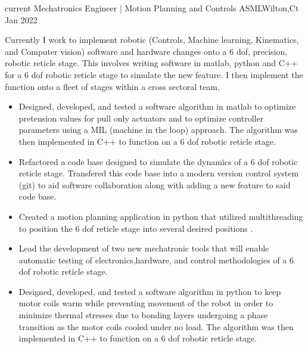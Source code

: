 \begin{experiences}

\experience
  {current}      {Mechatronics Engineer |  Motion Planning and Controls }{ASML}{Wilton,Ct}
  {Jan 2022} {
                  Currently I work to implement robotic (Controls, Machine learning, Kinematics, and Computer vision) software and hardware changes onto a 6 dof, precision, robotic reticle stage. This involves writing software in matlab, python and C++ for a 6 dof robotic reticle stage to simulate the new feature. I then implement the function onto a fleet of stages within a cross sectoral team. 
			\begin{itemize}
		\item Designed, developed, and tested  a software algorithm in matlab to optimize pretension values for pull only actuators and to optimize controller parameters using a MIL (machine in the loop) approach. The algorithm was then implemented in C++ to function on a 6 dof robotic reticle stage.
	\item Refactored a code base designed to simulate the dynamics of a 6 dof robotic reticle stage. Transfered this code base into a modern version control system (git) to aid software collaboration along with adding a new feature to said code base.
                       \item Created a motion planning application in python that utilized multithreading to position the 6 dof reticle stage into several desired positions  .
		    \item Lead the development of two new mechatronic tools that will enable automatic testing of electronics,hardware, and control methodologies of a 6 dof robotic reticle stage.
		 \item Designed, developed, and tested a software algorithm in python to keep motor coils warm while preventing movement of the robot in order to minimize thermal stresses due to bonding layers undergoing a phase transition as the motor coils cooled under no load. The algorithm was then implemented in C++ to function on a 6 dof robotic reticle stage.
		

\end{itemize}}
\end{experiences}

